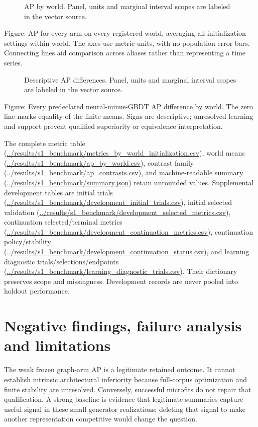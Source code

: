 \documentclass{article}
\begin{document}
\begin{figure}[t]
\centering

\caption{AP by world. Panel, units and marginal interval scopes are labeled in the vector source.}
\end{figure}

Figure: AP for every arm on every registered world, averaging all initialization settings within world. The axes use metric units, with no population error bars. Connecting lines aid comparison across aliases rather than representing a time series.

\begin{figure}[t]
\centering

\caption{Descriptive AP differences. Panel, units and marginal interval scopes are labeled in the vector source.}
\end{figure}

Figure: Every predeclared neural-minus-GBDT AP difference by world. The zero line marks equality of the finite means. Signs are descriptive; unresolved learning and support prevent qualified superiority or equivalence interpretation.

The complete metric table (\url{../results/s1_benchmark/metrics_by_world_initialization.csv}), world means (\url{../results/s1_benchmark/ap_by_world.csv}), contrast family (\url{../results/s1_benchmark/ap_contrasts.csv}), and machine-readable summary (\url{../results/s1_benchmark/summary.json}) retain unrounded values. Supplemental development tables are initial trials (\url{../results/s1_benchmark/development_initial_trials.csv}), initial selected validation (\url{../results/s1_benchmark/development_selected_metrics.csv}), continuation selected/terminal metrics (\url{../results/s1_benchmark/development_continuation_metrics.csv}), continuation policy/stability (\url{../results/s1_benchmark/development_continuation_status.csv}), and learning diagnostic trials/selections/endpoints (\url{../results/s1_benchmark/learning_diagnostic_trials.csv}). Their dictionary preserves scope and missingness. Development records are never pooled into holdout performance.

\section{Negative findings, failure analysis and limitations}

The weak frozen graph-arm AP is a legitimate retained outcome. It cannot establish intrinsic architectural inferiority because full-corpus optimization and finite stability are unresolved. Conversely, successful microfits do not repair that qualification. A strong baseline is evidence that legitimate summaries capture useful signal in these small generator realizations; deleting that signal to make another representation competitive would change the question.
\end{document}
